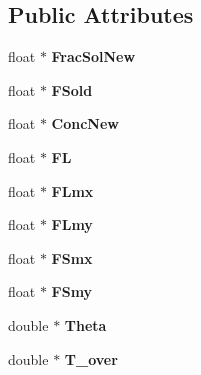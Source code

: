 \subsection*{Public Attributes}
\begin{DoxyCompactItemize}
\item 
\hypertarget{class_csim2d_a39a537a7da76e3f708ef3d125092277e}{}float $\ast$ {\bfseries Frac\+Sol\+New}\label{class_csim2d_a39a537a7da76e3f708ef3d125092277e}

\item 
\hypertarget{class_csim2d_ae77d4e4cbe4566351d2278e9845c5ff0}{}float $\ast$ {\bfseries F\+Sold}\label{class_csim2d_ae77d4e4cbe4566351d2278e9845c5ff0}

\item 
\hypertarget{class_csim2d_a475d27b534733d8706c3ee2d43b27ee0}{}float $\ast$ {\bfseries Conc\+New}\label{class_csim2d_a475d27b534733d8706c3ee2d43b27ee0}

\item 
\hypertarget{class_csim2d_a49f80e1620f6d8268ca3fbded294249f}{}float $\ast$ {\bfseries F\+L}\label{class_csim2d_a49f80e1620f6d8268ca3fbded294249f}

\item 
\hypertarget{class_csim2d_a74f4724bcefb25b97feb26d78b5960ca}{}float $\ast$ {\bfseries F\+Lmx}\label{class_csim2d_a74f4724bcefb25b97feb26d78b5960ca}

\item 
\hypertarget{class_csim2d_a1b9dad7ce0bf1ffe46bd3935a4f45c13}{}float $\ast$ {\bfseries F\+Lmy}\label{class_csim2d_a1b9dad7ce0bf1ffe46bd3935a4f45c13}

\item 
\hypertarget{class_csim2d_a268799d7669f0b495d3d30e22d229384}{}float $\ast$ {\bfseries F\+Smx}\label{class_csim2d_a268799d7669f0b495d3d30e22d229384}

\item 
\hypertarget{class_csim2d_afadcfa5a204348384205bf07b62d1d77}{}float $\ast$ {\bfseries F\+Smy}\label{class_csim2d_afadcfa5a204348384205bf07b62d1d77}

\item 
\hypertarget{class_csim2d_a2abd153a15df0d52d9a966277102a720}{}double $\ast$ {\bfseries Theta}\label{class_csim2d_a2abd153a15df0d52d9a966277102a720}

\item 
\hypertarget{class_csim2d_a488ba0ff3717be9d504f5e5d2be99205}{}double $\ast$ {\bfseries T\+\_\+over}\label{class_csim2d_a488ba0ff3717be9d504f5e5d2be99205}


\end{DoxyCompactItemize}
